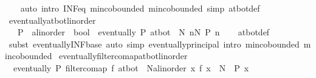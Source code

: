 \begin{isabellebody}
%
\isadelimproof
\ \ %
\endisadelimproof
%
\isatagproof
{}\isamarkupfalse%
\ {\isacharparenleft}{\kern0pt}auto\ intro{\isacharbang}{\kern0pt}{\isacharcolon}{\kern0pt}\ INF{\isacharunderscore}{\kern0pt}eq\ min{\isachardot}{\kern0pt}cobounded{}\ min{\isachardot}{\kern0pt}cobounded{}\ simp{\isacharcolon}{\kern0pt}\ at{\isacharunderscore}{\kern0pt}bot{\isacharunderscore}{\kern0pt}def{\isacharparenright}{\kern0pt}%
\endisatagproof
{\isafoldproof}%
%
\isadelimproof
\isanewline
%
\endisadelimproof
\isanewline
{}\isamarkupfalse%
\ eventually{\isacharunderscore}{\kern0pt}at{\isacharunderscore}{\kern0pt}bot{\isacharunderscore}{\kern0pt}linorder{\isacharcolon}{\kern0pt}\isanewline
\ \ \ P\ {\isacharcolon}{\kern0pt}{\isacharcolon}{\kern0pt}\ {\isachardoublequoteopen}{\isacharprime}{\kern0pt}a{\isacharcolon}{\kern0pt}{\isacharcolon}{\kern0pt}linorder\ {\isasymRightarrow}\ bool{\isachardoublequoteclose}\ \ {\isachardoublequoteopen}eventually\ P\ at{\isacharunderscore}{\kern0pt}bot\ {\isasymlongleftrightarrow}\ {\isacharparenleft}{\kern0pt}{\isasymexists}N{\isachardot}{\kern0pt}\ {\isasymforall}n{\isasymle}N{\isachardot}{\kern0pt}\ P\ n{\isacharparenright}{\kern0pt}{\isachardoublequoteclose}\isanewline
%
\isadelimproof
\ \ %
\endisadelimproof
%
\isatagproof
{}\isamarkupfalse%
\ at{\isacharunderscore}{\kern0pt}bot{\isacharunderscore}{\kern0pt}def\isanewline
\ \ \isamarkupfalse%
\ {\isacharparenleft}{\kern0pt}subst\ eventually{\isacharunderscore}{\kern0pt}INF{\isacharunderscore}{\kern0pt}base{\isacharparenright}{\kern0pt}\ {\isacharparenleft}{\kern0pt}auto\ simp{\isacharcolon}{\kern0pt}\ eventually{\isacharunderscore}{\kern0pt}principal\ intro{\isacharcolon}{\kern0pt}\ min{\isachardot}{\kern0pt}cobounded{}\ min{\isachardot}{\kern0pt}cobounded{}{\isacharparenright}{\kern0pt}%
\endisatagproof
{\isafoldproof}%
%
\isadelimproof
\isanewline
%
\endisadelimproof
\isanewline
{}\isamarkupfalse%
\ eventually{\isacharunderscore}{\kern0pt}filtercomap{\isacharunderscore}{\kern0pt}at{\isacharunderscore}{\kern0pt}bot{\isacharunderscore}{\kern0pt}linorder{\isacharcolon}{\kern0pt}\ \isanewline
\ \ {\isachardoublequoteopen}eventually\ P\ {\isacharparenleft}{\kern0pt}filtercomap\ f\ at{\isacharunderscore}{\kern0pt}bot{\isacharparenright}{\kern0pt}\ {\isasymlongleftrightarrow}\ {\isacharparenleft}{\kern0pt}{\isasymexists}N{\isacharcolon}{\kern0pt}{\isacharcolon}{\kern0pt}{\isacharprime}{\kern0pt}a{\isacharcolon}{\kern0pt}{\isacharcolon}{\kern0pt}linorder{\isachardot}{\kern0pt}\ {\isasymforall}x{\isachardot}{\kern0pt}\ f\ x\ {\isasymle}\ N\ {\isasymlongrightarrow}\ P\ x{\isacharparenright}{\kern0pt}{\isachardoublequoteclose}\isanewline

\end{isabellebody}
